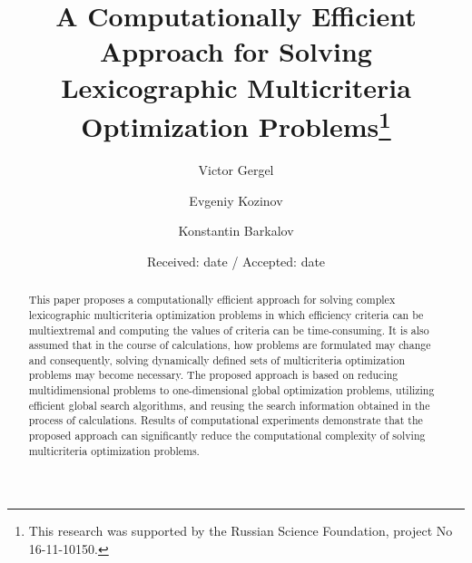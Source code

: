 \documentclass[smallextended]{svjour3}       %
\begin{document}
\title{A Computationally Efficient Approach for Solving Lexicographic Multicriteria Optimization Problems\thanks{This research was supported by the Russian Science Foundation, project No 16-11-10150. %
}
}


\author{Victor Gergel %
\and
Evgeniy Kozinov
\and
Konstantin Barkalov
}



\date{Received: date / Accepted: date}

\maketitle

\begin{abstract}
This paper proposes a computationally efficient approach for solving complex lexicographic multicriteria optimization problems in which efficiency criteria can be multiextremal and computing the values of criteria can be time-consuming. It is also assumed that in the course of calculations, how problems are formulated may change and consequently, solving dynamically defined sets of multicriteria optimization problems may become necessary. The proposed approach is based on reducing multidimensional problems to one-dimensional global optimization problems, utilizing efficient global search algorithms, and reusing the search information obtained in the process of calculations. Results of computational experiments demonstrate that the proposed approach can significantly reduce the computational complexity of solving multicriteria optimization problems.
\end{abstract}
\end{document}

